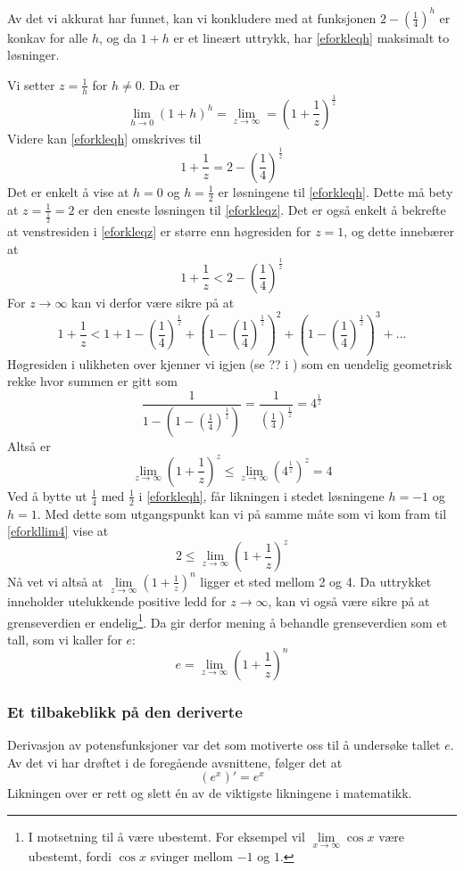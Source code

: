 Av det vi akkurat har funnet, kan vi konkludere med at funksjonen $2-\left(\frac{1}{4}\right)^h $ er konkav for alle $ h $, og da $ 1+h$ er et lineært uttrykk, har \eqref{eforkleqh} maksimalt to løsninger.\vsk

Vi setter $z=\frac{1}{h} $ for $ h\neq0 $. Da er
\[ \lim\limits_{h\to 0} (1+h)^h=\lim\limits_{z\to\infty}=\left(1+\frac{1}{z}\right)^\frac{1}{z} \]
Videre kan \eqref{eforkleqh} omskrives til
\begin{equation}\label{eforkleqz}
	1+\frac{1}{z}=2-\left(\frac{1}{4}\right)^\frac{1}{z}
\end{equation}
Det er enkelt å vise at $ h=0 $ og $ h=\frac{1}{2} $ er løsningene til \eqref{eforkleqh}. Dette må bety at $ z=\frac{1}{\frac{1}{2}}=2 $ er den eneste løsningen til \eqref{eforkleqz}. Det er også enkelt å bekrefte at venstresiden i \eqref{eforkleqz} er større enn høgresiden for $ z=1 $, og dette innebærer at
\[ 1+\frac{1}{z}<2-\left(\frac{1}{4}\right)^\frac{1}{z} \]
For $ z\to\infty $ kan vi derfor være sikre på at
\[ 1+\frac{1}{z}<1+1-\left(\frac{1}{4}\right)^\frac{1}{z}+\left(1-\left(\frac{1}{4}\right)^\frac{1}{z}\right)^2+\left(1-\left(\frac{1}{4}\right)^\frac{1}{z}\right)^3+... \]
Høgresiden i ulikheten over kjenner vi igjen (se ?? i \tmto) som en uendelig geometrisk rekke hvor summen er gitt som
\[ \frac{1}{1-\left(1-\left(\frac{1}{4}\right)^\frac{1}{z}\right)} =\frac{1}{\left(\frac{1}{4}\right)^\frac{1}{z}}=4^\frac{1}{z} \]
Altså er
\begin{equation}\label{eforkllim4}
	\lim\limits_{z\to\infty}\left(1+\frac{1}{z}\right)^z\leq \lim\limits_{z\to\infty}\left(4^\frac{1}{z}\right)^z=4
\end{equation}
Ved å bytte ut $ \frac{1}{4} $ med $ \frac{1}{2} $ i \eqref{eforkleqh}, får likningen i stedet løsningene $ {h=-1} $ og $ {h=1} $. Med dette som utgangspunkt kan vi på samme måte som vi kom fram til \eqref{eforkllim4} vise at
\[ 	2\leq\lim\limits_{z\to\infty}\left(1+\frac{1}{z}\right)^z \] 
Nå vet vi altså at $ \lim\limits_{z\to\infty }\left(1+\frac{1}{z}\right)^n $ ligger et sted mellom 2 og 4.
Da uttrykket inneholder utelukkende positive ledd for $ {z\to\infty} $, kan vi også være sikre på at grenseverdien er endelig\footnote{I motsetning til å være ubestemt. For eksempel vil $ \lim\limits_{x\to \infty} \cos x $  være ubestemt, fordi $ \cos x $ svinger mellom $ -1 $ og $ 1 $.}. Da gir derfor mening å behandle grenseverdien som et tall, som vi kaller for $ e $:
\[ e=\lim\limits_{z\to\infty }\left(1+\frac{1}{z}\right)^n  \]
\subsubsection{Et tilbakeblikk på den deriverte}
Derivasjon av potensfunksjoner var det som motiverte oss til å undersøke tallet $ e $. Av det vi har drøftet i de foregående avsnittene, følger det at
\[ \left(e^x\right)'=e^x \]
Likningen over er rett og slett én av de viktigste likningene i matematikk.
